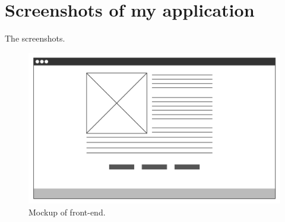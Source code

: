 \chapter{Screenshots of my application}
\label{app:screen}

The screenshots.
\begin{figure}[ht]
    \centering
    \includegraphics[width=\textwidth]{3_back_matter/appendices/images/mockup.png}
    \caption{Mockup of front-end.}
    \label{fig:mockup_front-end_append}
\end{figure}